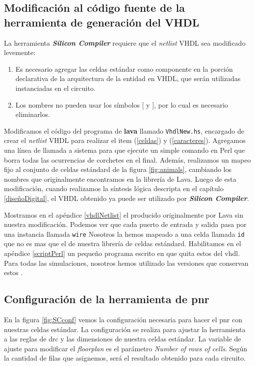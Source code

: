 \subsection{Modificación al código fuente de la herramienta de generación del  VHDL} 

La herramienta \textbf{\emph{Silicon Compiler}} requiere que el \emph{netlist} VHDL sea modificado levemente:
\begin{enumerate}
\item\label{celdas} Es necesario agregar las celdas estándar como componente en la porción declarativa de la arquitectura de la entidad  en VHDL, que serán utilizadas instanciadas en el circuito.
\item\label{caracteres} Los nombres no pueden usar los símbolos [ y ], por lo cual es necesario eliminarlos.
\end{enumerate} 
 
Modificamos el código del programa de \textbf{lava} llamado \verb|VhdlNew.hs|, encargado de crear el \emph{netlist} \gls{VHDL} para realizar el item (\ref{celdas}) y (\ref{caracteres}). Agregamos una línea de llamada a sistema para que ejecute un simple comando en Perl que borra todas las ocurrencias de corchetes en el  final. Además, realizamos un mapeo fijo al conjunto de celdas estándard de la figura \ref{fig:animals}, cambiando los nombres que originalmente encontramos en la librería de Lava. Luego de esta modificación, cuando realizamos la síntesis lógica descripta en el capítulo \ref{diseñoDigital}, el  VHDL obtenido ya puede ser utilizado por \textbf{\emph{Silicon Compiler}}.

Mostramos en el apéndice \ref{vhdlNetlist} el  producido originalmente por Lava sin nuestra modificación. Podemos ver que cada puerto de entrada y salida pasa por una instancia llamada \verb.wire. Nosotros la hemos mapeado a una celda llamada \verb.id. que no es mas que el  de nuestra librería de celdas estándard. Habilitamos en el apéndice \ref{scriptPerl} un pequeño programa escrito en  que quita estos  del  \gls{vhdl}. Para todas las simulaciones, nosotros hemos utilizado las versiones que conservan estos .



\subsection{Configuración de la herramienta de \gls{pnr}}
En la figura \ref{fig:SCconf} vemos la configuración necesaria para hacer el \gls{pnr} con nuestras celdas estándar. La configuración se realiza para ajustar la herramienta a las reglas de \gls{drc} y las dimensiones de nuestra celdas estándar. La variable de ajuste para modificar el \emph{floorplan} es el parámetro \emph{Number of rows of cells}. Según la cantidad de filas que asignemos, será el resultado obtenido para cada circuito. 


